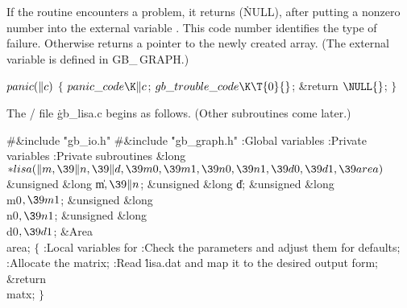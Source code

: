 If the  routine encounters a problem, it returns \PB{$\NULL$}
(\.{NULL}), after putting a nonzero number into the external variable
. This code number identifies the type of failure.
Otherwise  returns a pointer to the newly created array. (The
external variable  is defined in {\sc GB\_\,GRAPH}.)

\Y\B\4\D$\\{panic}(\|c)$ \5
${}\{{}$\5
\1${}\\{panic\_code}\K\|c{}$;\5
${}\\{gb\_trouble\_code}\K\T{0}{}$;\5
\&{return} ${}\NULL{}$;\5
${}\}{}$\2\par
\fi

The \CEE/ file \.{gb\_lisa.c} begins as follows. (Other subroutines
come later.)

\Y\B\8\#\&{include} \.{"gb\_io.h"}\6
\8\#\&{include} \.{"gb\_graph.h"}\6
\ATH\7
:Global variables\X\6
:Private variables\X\6
:Private subroutines\X\7
\1\1\&{long} ${}{*}\\{lisa}(\|m,\39\|n,\39\|d,\39\\{m0},\39\\{m1},\39\\{n0},\39%
\\{n1},\39\\{d0},\39\\{d1},\39\\{area}){}$\6
\&{unsigned} \&{long} \|m${},\39\|n{}$;%
\6
\&{unsigned} \&{long} \|d;\6
\&{unsigned} \&{long} \\{m0}${},\39\\{m1}{}$;\C{ input will be from rows $[\PB{%
\\{m0}}\,.\,.\,\PB{\\{m1}})$ }\6
\&{unsigned} \&{long} \\{n0}${},\39\\{n1}{}$;\C{ and from columns $[\PB{\\{n0}}%
\,.\,.\,\PB{\\{n1}})$ }\6
\&{unsigned} \&{long} \\{d0}${},\39\\{d1}{}$;\6
\&{Area} \\{area};\2\2\6
${}\{{}$\5
\1:Local variables for \X\7
:Check the parameters and adjust them for defaults\X;\6
:Allocate the matrix\X;\6
:Read \.{lisa.dat} and map it to the desired output form\X;\6
\&{return} \\{matx};\6
\4${}\}{}$\2\par
\fi

